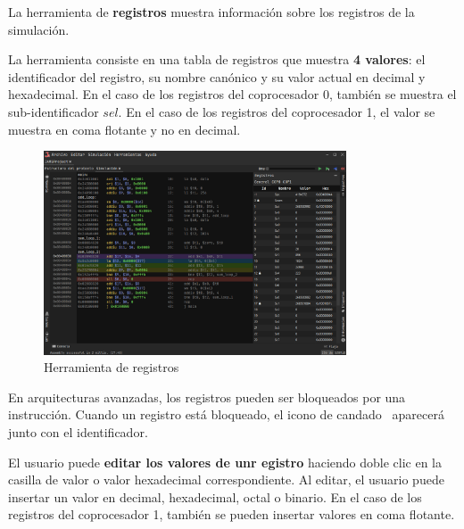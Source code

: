 La herramienta de \textbf{registros} muestra información sobre
los registros de la simulación.

\noindent La herramienta consiste en una tabla de registros
que muestra \textbf{4 valores}: el identificador del registro,
su nombre canónico y su valor actual en decimal y hexadecimal.
En el caso de los registros del coprocesador 0,
también se muestra el sub-identificador $sel$.
En el caso de los registros del coprocesador 1,
el valor se muestra en coma flotante y no en decimal.

\begin{figure}[H]
    \centering
    \includegraphics[width=0.8\textwidth]{images/tools/jams-registers}
    \caption{Herramienta de registros}
    \label{fig:jams-registers}
\end{figure}

\noindent En arquitecturas avanzadas, los registros pueden ser
bloqueados por una instrucción.
Cuando un registro está bloqueado, el icono de candado \faLock \
aparecerá junto con el identificador.

\noindent El usuario puede \textbf{editar los valores de unr egistro}
haciendo doble clic en la casilla de valor
o valor hexadecimal correspondiente.
Al editar, el usuario puede insertar un valor en decimal,
hexadecimal, octal o binario.
En el caso de los registros del coprocesador 1,
también se pueden insertar valores en coma flotante.
